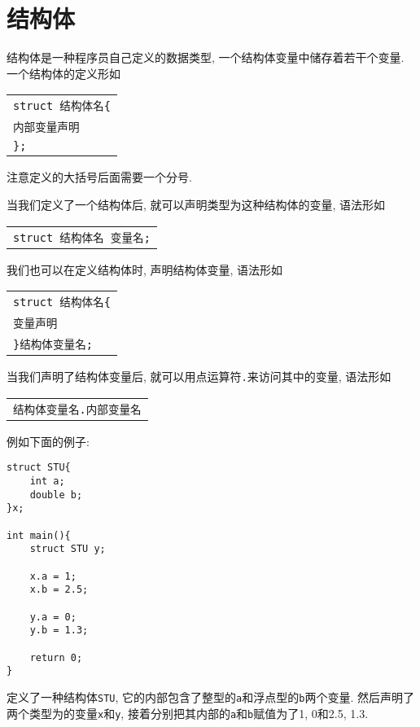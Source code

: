 \chapter{结构体} \label{结构体}
    结构体是一种程序员自己定义的数据类型, 一个结构体变量中储存着若干个变量. 一个结构体的定义形如
    \begin{center}
    \begin{longtable}{l}
        \texttt{struct 结构体名\{} \\
        \qquad \texttt{内部变量声明} \\
        \texttt{\};}
    \end{longtable}
    \end{center}

    注意定义的大括号后面需要一个分号.

    当我们定义了一个结构体后, 就可以声明类型为这种结构体的变量, 语法形如
    \begin{center}
    \begin{longtable}{l}
        \texttt{struct 结构体名~变量名;}
    \end{longtable}
    \end{center}

    我们也可以在定义结构体时, 声明结构体变量, 语法形如
    \begin{center}
    \begin{longtable}{l}
        \texttt{struct 结构体名\{} \\
        \qquad \texttt{变量声明} \\
        \texttt{\}结构体变量名;}
    \end{longtable}
    \end{center}

    当我们声明了结构体变量后, 就可以用点运算符\texttt{.}来访问其中的变量, 语法形如
    \begin{center}
    \begin{longtable}{l}
        \texttt{结构体变量名.内部变量名}
    \end{longtable}
    \end{center}

    例如下面的例子:
\begin{lstlisting}
struct STU{
    int a;
    double b;
}x;

int main(){
    struct STU y;
    
    x.a = 1;
    x.b = 2.5;

    y.a = 0;
    y.b = 1.3;

    return 0;
}
\end{lstlisting}
    定义了一种结构体\texttt{STU}, 它的内部包含了整型的\texttt{a}和浮点型的\texttt{b}两个变量. 然后声明了两个类型为的变量\texttt{x}和\texttt{y}, 接着分别把其内部的\texttt{a}和\texttt{b}赋值为了1, 0和2.5, 1.3.

